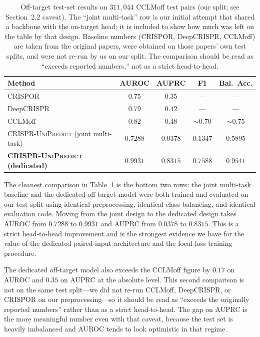 \documentclass[11pt,a4paper]{article}
\begin{document}
\begin{table}[h]
\centering
\caption{Off-target test-set results on $311{,}044$ CCLMoff test pairs (our split; see Section~2.2 caveat). The ``joint multi-task'' row is our initial attempt that shared a backbone with the on-target head; it is included to show how much was left on the table by that design. Baseline numbers (CRISPOR, DeepCRISPR, CCLMoff) are taken from the original papers, were obtained on those papers' own test splits, and were not re-run by us on our split. The comparison should be read as ``exceeds reported numbers,'' not as a strict head-to-head.}
\label{tab:offtarget}
\small
\begin{tabular}{lcccc}
\toprule
Method & AUROC & AUPRC & F1 & Bal.~Acc. \\
\midrule
CRISPOR~\citep{crispor}                & $0.75$ & $0.35$ & ---     & ---     \\
DeepCRISPR~\citep{deepcrispr}          & $0.79$ & $0.42$ & ---     & ---     \\
CCLMoff~\citep{cclmoff}                & $0.82$ & $0.48$ & $\sim 0.70$ & $\sim 0.75$ \\
\midrule
\textsc{CRISPR-UniPredict} (joint multi-task) & $0.7288$ & $0.0378$ & $0.1347$ & $0.5895$ \\
\textbf{\textsc{CRISPR-UniPredict} (dedicated)} & $\mathbf{0.9931}$ & $\mathbf{0.8315}$ & $\mathbf{0.7588}$ & $\mathbf{0.9541}$ \\
\bottomrule
\end{tabular}
\end{table}

The cleanest comparison in Table~\ref{tab:offtarget} is the bottom two rows: the joint multi-task baseline and the dedicated off-target model were both trained and evaluated on our test split using identical preprocessing, identical class balancing, and identical evaluation code. Moving from the joint design to the dedicated design takes AUROC from $0.7288$ to $0.9931$ and AUPRC from $0.0378$ to $0.8315$. This is a strict head-to-head improvement and is the strongest evidence we have for the value of the dedicated paired-input architecture and the focal-loss training procedure.

The dedicated off-target model also exceeds the CCLMoff figure by $0.17$ on AUROC and $0.35$ on AUPRC at the absolute level. This second comparison is not on the same test split---we did not re-run CCLMoff, DeepCRISPR, or CRISPOR on our preprocessing---so it should be read as ``exceeds the originally reported numbers'' rather than as a strict head-to-head. The gap on AUPRC is the more meaningful number even with that caveat, because the test set is heavily imbalanced and AUROC tends to look optimistic in that regime.
\end{document}
